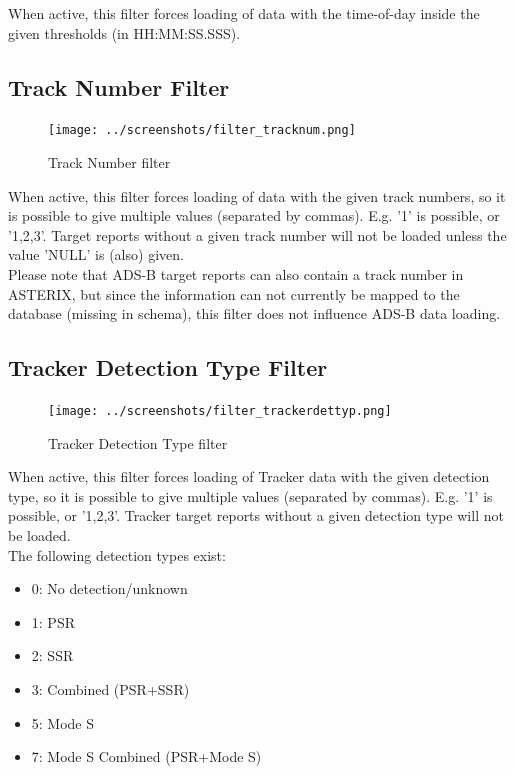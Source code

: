 When active, this filter forces loading of data with the time-of-day inside the given thresholds (in HH:MM:SS.SSS).

\subsection{Track Number Filter}

\begin{figure}[H]
  \center
    \texttt{[image: ../screenshots/filter\_tracknum.png]}
  \caption{Track Number filter}
\end{figure}

When active, this filter forces loading of data with the given track numbers, so it is possible to give multiple values (separated by commas). E.g. '1' is possible, or '1,2,3'. Target reports without a given track number will not be loaded unless the value 'NULL' is (also) given. \\

Please note that ADS-B target reports can also contain a track number in ASTERIX, but since the information can not currently be mapped to the database (missing in schema), this filter does not influence ADS-B data loading.

\subsection{Tracker Detection Type Filter}

\begin{figure}[H]
  \center
    \texttt{[image: ../screenshots/filter\_trackerdettyp.png]}
  \caption{Tracker Detection Type filter}
\end{figure}

When active, this filter forces loading of Tracker data with the given detection type, so it is possible to give multiple values (separated by commas). E.g. '1' is possible, or '1,2,3'. Tracker target reports without a given detection type will not be loaded. \\

The following detection types exist:
\begin{itemize}
 \item 0: No detection/unknown
 \item 1: PSR
 \item 2: SSR
 \item 3: Combined (PSR+SSR)
 \item 5: Mode S
 \item 7: Mode S Combined (PSR+Mode S)
\end{itemize}
\  \\

